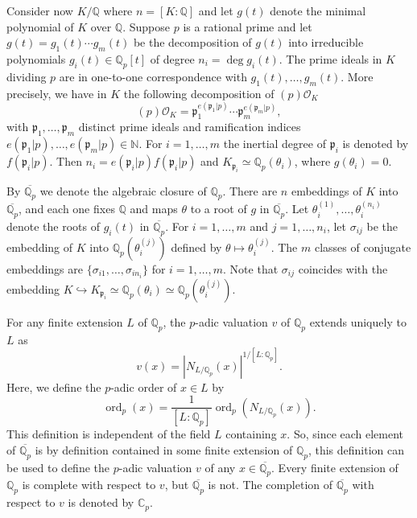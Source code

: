 \documentclass[11pt]{report}
\theoremstyle{definition}
\DeclareMathOperator{\ord}{ord}
\begin{document}
Consider now $K/\mathbb{Q}$ where $n = [K:\mathbb{Q}]$ and let $g(t)$ denote the minimal polynomial of $K$ over $\mathbb{Q}$. Suppose $p$ is a rational prime and let $g(t) = g_1(t) \cdots g_m(t)$ be the decomposition of $g(t)$ into irreducible polynomials $g_i(t) \in \mathbb{Q}_p[t]$ of degree $n_i = \deg g_i(t)$. The prime ideals in $K$ dividing $p$ are in one-to-one correspondence with $g_1(t), \dots, g_m(t)$. More precisely, we have in $K$ the following decomposition of $(p)\mathcal{O}_K$
\[(p)\mathcal{O}_K = \mathfrak{p}_1^{e(\mathfrak{p}_1|p)} \cdots \mathfrak{p}_m^{e(\mathfrak{p}_m|p)},\]
with $\mathfrak{p}_1, \dots, \mathfrak{p}_m$ distinct prime ideals and ramification indices $e(\mathfrak{p}_1 | p), \dots, e(\mathfrak{p}_m | p) \in \mathbb{N}$. For $i = 1, \dots, m$ the inertial degree of $\mathfrak{p}_i$ is denoted by $f(\mathfrak{p}_i|p)$. Then $n_i = e(\mathfrak{p}_i | p)f(\mathfrak{p}_i | p)$ and $K_{\mathfrak{p}_i} \simeq \mathbb{Q}_p(\theta_i)$, where $g(\theta_i) = 0$.

By $\overline{\mathbb{Q}_p}$ we denote the algebraic closure of $\mathbb{Q}_p$. There are $n$ embeddings of $K$ into $\overline{\mathbb{Q}_p}$, and each one fixes $\mathbb{Q}$ and maps $\theta$ to a root of $g$ in $\overline{\mathbb{Q}_p}$. Let $\theta_i^{(1)}, \dots, \theta_i^{(n_i)}$ denote the roots of $g_i(t)$ in $\overline{\mathbb{Q}_p}$. For $i = 1, \dots, m$ and $j = 1, \dots, n_i$, let $\sigma_{ij}$ be the embedding of $K$ into $\mathbb{Q}_p(\theta_i^{(j)})$ defined by $\theta \mapsto \theta_i^{(j)}$. The $m$ classes of conjugate embeddings are $\{\sigma_{i1}, \dots, \sigma_{in_i}\}$ for $i = 1, \dots, m$. Note that $\sigma_{ij}$ coincides with the embedding $K \hookrightarrow K_{\mathfrak{p}_i} \simeq \mathbb{Q}_p(\theta_i) \simeq \mathbb{Q}_p(\theta_i^{(j)})$.

For any finite extension $L$ of $\mathbb{Q}_p$, the $p$-adic valuation $v$ of $\mathbb{Q}_p$ extends uniquely to $L$ as
\[v(x) = |N_{L/\mathbb{Q}_p}(x)|^{1/[L:\mathbb{Q}_p]}.\]
Here, we define the $p$-adic order of $x \in L$ by
\[\ord_p(x) = \frac{1}{[L:\mathbb{Q}_p]}\ord_p(N_{L/\mathbb{Q}_p}(x)).\]
This definition is independent of the field $L$ containing $x$. So, since each element of $\overline{\mathbb{Q}_p}$ is by definition contained in some finite extension of $\mathbb{Q}_p$, this definition can be used to define the $p$-adic valuation $v$ of any $x \in \overline{\mathbb{Q}_p}$. Every finite extension of $\mathbb{Q}_p$ is complete with respect to $v$, but $\overline{\mathbb{Q}_p}$ is not. The completion of $\overline{\mathbb{Q}_p}$ with respect to $v$ is denoted by $\mathbb{C}_p$.
\end{document}
